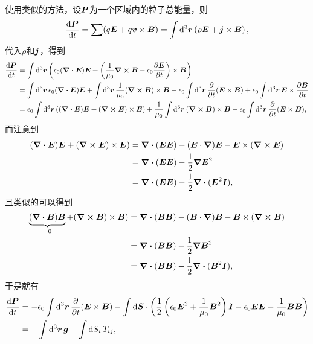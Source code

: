 \documentclass[UTF8, a4paper]{ctexart}
\begin{document}
使用类似的方法，设$\vb*{P}$为一个区域内的粒子总能量，则
\[
    \dv{\vb*{P}}{t} = \sum (q \vb*{E} + q \vb*{v} \times \vb*{B}) = \int \dd[3]{\vb*{r}} \left( \rho \vb*{E} + \vb*{j} \times \vb*{B} \right),
\]
代入$\rho$和$\vb*{j}$，得到
\[
    \begin{aligned}
        \dv{\vb*{P}}{t} &= \int \dd[3]{\vb*{r}} \left(\epsilon_0 (\div{\vb*{E}}) \vb*{E} + \left( \frac{1}{\mu_0} \curl{\vb*{B}} - \epsilon_0 \pdv{\vb*{E}}{t} \right) \times \vb*{B} \right) \\
        &= \int \dd[3]{\vb*{r}} \epsilon_0 (\div{\vb*{E}}) \vb*{E} + \int \dd[3]{\vb*{r}} \frac{1}{\mu_0} (\curl{\vb*{B}}) \times \vb*{B} - \epsilon_0 \int \dd[3]{\vb*{r}} \pdv{t} (\vb*{E} \times \vb*{B}) + \epsilon_0 \int \dd[3]{\vb*{r}} \vb*{E} \times \pdv{\vb*{B}}{t} \\
        &= \epsilon_0 \int \dd[3]{\vb*{r}} ((\div{\vb*{E}}) \vb*{E} + (\curl{\vb*{E}}) \times \vb*{E}) + \frac{1}{\mu_0} \int \dd[3]{\vb*{r}} (\curl{\vb*{B}}) \times \vb*{B} - \epsilon_0 \int \dd[3]{\vb*{r}} \pdv{t} (\vb*{E} \times \vb*{B}),
    \end{aligned}
\]
而注意到
\[
    \begin{aligned}
        (\div{\vb*{E}}) \vb*{E} + (\curl{\vb*{E}}) \times \vb*{E}) &= \div{(\vb*{E} \vb*{E})} - (\vb*{E} \cdot \grad) \vb*{E} - \vb*{E} \times (\curl{\vb*{E}}) \\
        &= \div{(\vb*{E} \vb*{E})} - \frac{1}{2} \grad{\vb*{E}^2} \\
        &= \div{(\vb*{E} \vb*{E})} - \frac{1}{2} \div{(\vb*{E}^2 \vb*{I})},
    \end{aligned}
\]
且类似的可以得到
\[
    \begin{aligned}
        \underbrace{(\div{\vb*{B}}) \vb*{B}}_{=0} + (\curl{\vb*{B}}) \times \vb*{B}) &= \div{(\vb*{B} \vb*{B})} - (\vb*{B} \cdot \grad) \vb*{B} - \vb*{B} \times (\curl{\vb*{B}}) \\
        &= \div{(\vb*{B} \vb*{B})} - \frac{1}{2} \grad{\vb*{B}^2} \\
        &= \div{(\vb*{B} \vb*{B})} - \frac{1}{2} \div{(\vb*{B}^2 \vb*{I})},
    \end{aligned}
\]
于是就有
\[
    \begin{aligned}
        \dv{\vb*{P}}{t} &= - \epsilon_0 \int \dd[3]{\vb*{r}} \pdv{t} (\vb*{E} \times \vb*{B}) - \int \dd{\vb*{S}} \cdot \left( \frac{1}{2} \left( \epsilon_0 \vb*{E}^2 + \frac{1}{\mu_0} \vb*{B}^2 \right) \vb*{I} - \epsilon_0 \vb*{E} \vb*{E} - \frac{1}{\mu_0} \vb*{B} \vb*{B} \right) \\
        &= - \int \dd[3]{\vb*{r}} \vb*{g} - \int \dd{S_i} T_{ij},
    \end{aligned}
\]
\end{document}
